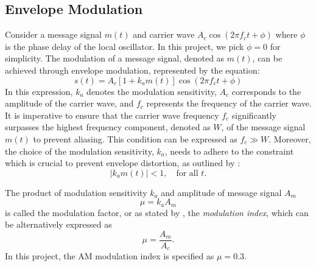\documentclass[../ECE459FinalProjectReport.tex]{subfiles}
\begin{document}
\subsection{Envelope Modulation}
Consider a message signal $m\left(t\right)$ and carrier wave $A_c \cos\left(2\pi f_c t + \phi\right)$ where $\phi$ is the phase delay of the local oscillator. In this project, we pick $\phi = 0$ for simplicity. The modulation of a message signal, denoted as $m\left(t\right)$, can be achieved through envelope modulation, represented by the equation:
\begin{equation}
    s\left(t\right) = A_c \left[1 + k_a m\left(t\right)\right] \cos \left(2\pi f_c t + \phi\right)
\end{equation}
In this expression, $k_a$ denotes the modulation sensitivity, $A_c$ corresponds to the amplitude of the carrier wave, and $f_c$ represents the frequency of the carrier wave. It is imperative to ensure that the carrier wave frequency $f_c$ significantly surpasses the highest frequency component, denoted as $W$, of the message signal $m\left(t\right)$ to prevent aliasing. This condition can be expressed as $f_c \gg W$. Moreover, the choice of the modulation sensitivity, $k_a$, needs to adhere to the constraint which is crucial to prevent envelope distortion, as outlined by \textcite[pp. 101-102]{haykinIntroductionAnalogDigital2007}:
\begin{equation}
    \left| k_a m\left(t\right) \right| < 1, \quad \text{for all }t.
\end{equation}

The product of modulation sensitivity $k_a$ and amplitude of message signal $A_m$
\begin{equation}
    \mu = k_a A_m
\end{equation}
is called the modulation factor, or as stated by \cite{sasmitaModulationIndexModulation2020}, the \textit{modulation index}, which can be alternatively expressed as
\begin{equation}
    \mu = \frac{A_m}{A_c}.
\end{equation}
In this project, the AM modulation index is specified as $\mu=0.3$.
\end{document}
